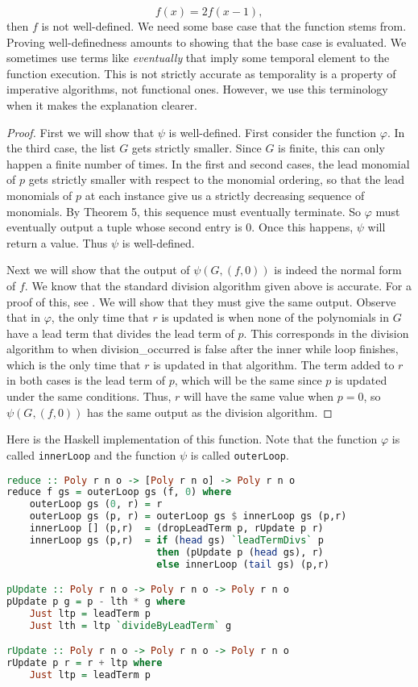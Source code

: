 \documentclass[MS, xcolor=dvipsnames]{wfuthesis}
\theoremstyle{definition}
\def\p{\varphi}
\begin{document}
\[ f(x) = 2f(x-1), \]
then $f$ is not well-defined. We need some base case that the function stems from. Proving well-definedness amounts to showing that the base case is evaluated. We sometimes use terms like \emph{eventually} that imply some temporal element to the function execution. This is not strictly accurate as temporality is a property of imperative algorithms, not functional ones. However, we use this terminology when it makes the explanation clearer.
\begin{proof}
  First we will show that $\psi$ is well-defined. First consider the function $\p$. In the third case, the list $G$ gets strictly smaller. Since $G$ is finite, this can only happen a finite number of times. In the first and second cases, the lead monomial of $p$ gets strictly smaller with respect to the monomial ordering, so that the lead monomials of $p$ at each instance give us a strictly decreasing sequence of monomials. By Theorem 5, this sequence must eventually terminate. So $\p$ must eventually output a tuple whose second entry is 0. Once this happens, $\psi$ will return a value. Thus $\psi$ is well-defined. \par
  Next we will show that the output of $\psi(G,(f,0))$ is indeed the normal form of $f$. We know that the standard division algorithm given above is accurate. For a proof of this, see \cite{Cox2015}. We will show that they must give the same output. Observe that in $\p$, the only time that $r$ is updated is when none of the polynomials in $G$ have a lead term that divides the lead term of $p$. This corresponds in the division algorithm to when division\_occurred is false after the inner while loop finishes, which is the only time that $r$ is updated in that algorithm. The term added to $r$ in both cases is the lead term of $p$, which will be the same since $p$ is updated under the same conditions. Thus, $r$ will have the same value when $p=0$, so $\psi(G,(f,0))$ has the same output as the division algorithm.
\end{proof}
Here is the Haskell implementation of this function. Note that the function $\p$ is called \lstinline{innerLoop} and the function $\psi$ is called \lstinline{outerLoop}.
\begin{lstlisting}[language=Haskell]
reduce :: Poly r n o -> [Poly r n o] -> Poly r n o
reduce f gs = outerLoop gs (f, 0) where
    outerLoop gs (0, r) = r
    outerLoop gs (p, r) = outerLoop gs $ innerLoop gs (p,r)
    innerLoop [] (p,r)  = (dropLeadTerm p, rUpdate p r)
    innerLoop gs (p,r)  = if (head gs) `leadTermDivs` p
                          then (pUpdate p (head gs), r)
                          else innerLoop (tail gs) (p,r)

pUpdate :: Poly r n o -> Poly r n o -> Poly r n o
pUpdate p g = p - lth * g where
    Just ltp = leadTerm p
    Just lth = ltp `divideByLeadTerm` g

rUpdate :: Poly r n o -> Poly r n o -> Poly r n o
rUpdate p r = r + ltp where
    Just ltp = leadTerm p
\end{lstlisting}
\end{document}
